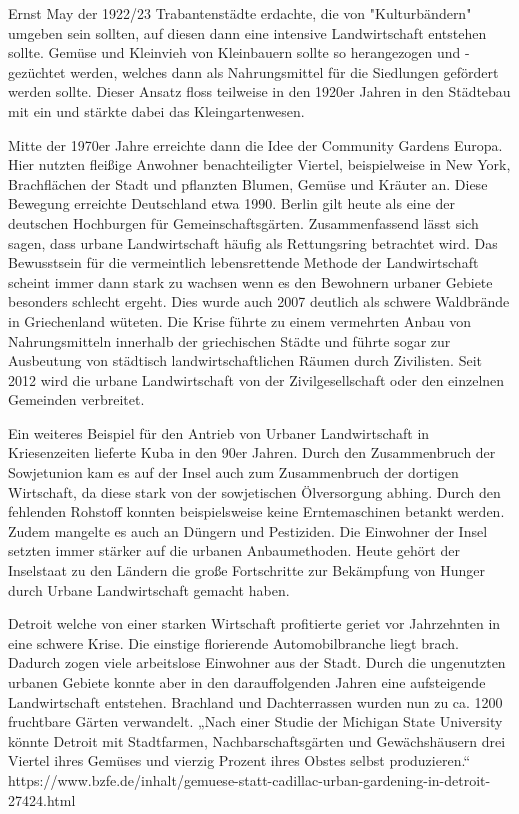 \documentclass{scrartcl}
\begin{document}
Ernst May der 1922/23 Trabantenstädte erdachte, die von "Kulturbändern" umgeben sein sollten, auf diesen dann eine intensive Landwirtschaft entstehen sollte. Gemüse und Kleinvieh von Kleinbauern sollte so herangezogen und -gezüchtet werden, welches dann als Nahrungsmittel für die Siedlungen gefördert werden sollte. Dieser Ansatz floss teilweise in den 1920er Jahren in den Städtebau mit ein und stärkte dabei das Kleingartenwesen.

Mitte der 1970er Jahre erreichte dann die Idee der Community Gardens Europa. Hier nutzten fleißige Anwohner benachteiligter Viertel, beispielweise in New York, Brachflächen der Stadt und pflanzten Blumen, Gemüse und Kräuter an. Diese Bewegung erreichte Deutschland etwa 1990. Berlin gilt heute als eine der deutschen Hochburgen für Gemeinschaftsgärten. Zusammenfassend lässt sich sagen, dass urbane Landwirtschaft häufig als Rettungsring betrachtet wird. Das Bewusstsein für die vermeintlich lebensrettende Methode der Landwirtschaft scheint immer dann stark zu wachsen wenn es den Bewohnern urbaner Gebiete besonders schlecht ergeht. Dies wurde auch 2007 deutlich als schwere Waldbrände in Griechenland wüteten. Die Krise führte zu einem vermehrten Anbau von Nahrungsmitteln innerhalb der griechischen Städte und führte sogar zur Ausbeutung von städtisch landwirtschaftlichen Räumen durch Zivilisten. Seit 2012 wird die urbane Landwirtschaft von der Zivilgesellschaft oder den einzelnen Gemeinden verbreitet.

Ein weiteres Beispiel für den Antrieb von Urbaner Landwirtschaft in Kriesenzeiten lieferte Kuba in den 90er Jahren. Durch den Zusammenbruch der Sowjetunion kam es auf der Insel auch zum Zusammenbruch der dortigen Wirtschaft, da diese stark von der sowjetischen Ölversorgung abhing. Durch den fehlenden Rohstoff konnten beispielsweise keine Erntemaschinen betankt werden. Zudem mangelte es auch an Düngern und Pestiziden. Die Einwohner der Insel setzten immer stärker auf die urbanen Anbaumethoden. Heute gehört der Inselstaat zu den Ländern die große Fortschritte zur Bekämpfung von Hunger durch Urbane Landwirtschaft gemacht haben.

Detroit welche von einer starken Wirtschaft profitierte geriet vor Jahrzehnten in eine schwere Krise. Die einstige florierende Automobilbranche liegt brach. Dadurch zogen viele arbeitslose Einwohner aus der Stadt. Durch die ungenutzten urbanen Gebiete konnte aber in den darauffolgenden Jahren eine aufsteigende Landwirtschaft entstehen. Brachland und Dachterrassen wurden nun zu ca. 1200 fruchtbare Gärten verwandelt. „Nach einer Studie der Michigan State University könnte Detroit mit Stadtfarmen, Nachbarschaftsgärten und Gewächshäusern drei Viertel ihres Gemüses und vierzig Prozent ihres Obstes selbst produzieren.“ https://www.bzfe.de/inhalt/gemuese-statt-cadillac-urban-gardening-in-detroit-27424.html
\end{document}

